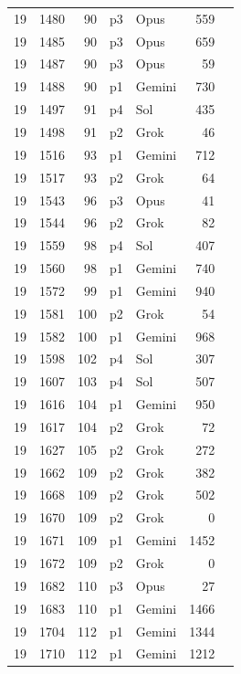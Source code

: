 \begin{longtable}{r r r l l r L{2.3in}}
19 & 1480 & 90 & p3 & Opus & 559 &  \\
19 & 1485 & 90 & p3 & Opus & 659 &  \\
19 & 1487 & 90 & p3 & Opus & 59 &  \\
19 & 1488 & 90 & p1 & Gemini & 730 &  \\
19 & 1497 & 91 & p4 & Sol & 435 &  \\
19 & 1498 & 91 & p2 & Grok & 46 &  \\
19 & 1516 & 93 & p1 & Gemini & 712 &  \\
19 & 1517 & 93 & p2 & Grok & 64 &  \\
19 & 1543 & 96 & p3 & Opus & 41 &  \\
19 & 1544 & 96 & p2 & Grok & 82 &  \\
19 & 1559 & 98 & p4 & Sol & 407 &  \\
19 & 1560 & 98 & p1 & Gemini & 740 &  \\
19 & 1572 & 99 & p1 & Gemini & 940 &  \\
19 & 1581 & 100 & p2 & Grok & 54 &  \\
19 & 1582 & 100 & p1 & Gemini & 968 &  \\
19 & 1598 & 102 & p4 & Sol & 307 &  \\
19 & 1607 & 103 & p4 & Sol & 507 &  \\
19 & 1616 & 104 & p1 & Gemini & 950 &  \\
19 & 1617 & 104 & p2 & Grok & 72 &  \\
19 & 1627 & 105 & p2 & Grok & 272 &  \\
19 & 1662 & 109 & p2 & Grok & 382 &  \\
19 & 1668 & 109 & p2 & Grok & 502 &  \\
19 & 1670 & 109 & p2 & Grok & 0 &  \\
19 & 1671 & 109 & p1 & Gemini & 1452 &  \\
19 & 1672 & 109 & p2 & Grok & 0 &  \\
19 & 1682 & 110 & p3 & Opus & 27 &  \\
19 & 1683 & 110 & p1 & Gemini & 1466 &  \\
19 & 1704 & 112 & p1 & Gemini & 1344 &  \\
19 & 1710 & 112 & p1 & Gemini & 1212 &  \\

\end{longtable}

